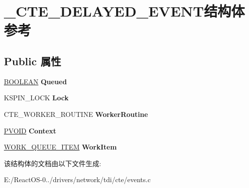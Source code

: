 \hypertarget{struct___c_t_e___d_e_l_a_y_e_d___e_v_e_n_t}{}\section{\+\_\+\+C\+T\+E\+\_\+\+D\+E\+L\+A\+Y\+E\+D\+\_\+\+E\+V\+E\+N\+T结构体 参考}
\label{struct___c_t_e___d_e_l_a_y_e_d___e_v_e_n_t}
\subsection*{Public 属性}
\begin{DoxyCompactItemize}
\item 
\mbox{\label{struct___c_t_e___d_e_l_a_y_e_d___e_v_e_n_t_a363247b4f1fa4649550b128fb5b560fe}} 
\hyperlink{_processor_bind_8h_a112e3146cb38b6ee95e64d85842e380a}{B\+O\+O\+L\+E\+AN} {\bfseries Queued}
\item 
\mbox{\label{struct___c_t_e___d_e_l_a_y_e_d___e_v_e_n_t_a48ec4bda696974fedcf2b5cd2de86de3}} 
K\+S\+P\+I\+N\+\_\+\+L\+O\+CK {\bfseries Lock}
\item 
\mbox{\label{struct___c_t_e___d_e_l_a_y_e_d___e_v_e_n_t_a595476a64a13284208a73dcaf75c83c0}} 
C\+T\+E\+\_\+\+W\+O\+R\+K\+E\+R\+\_\+\+R\+O\+U\+T\+I\+NE {\bfseries Worker\+Routine}
\item 
\mbox{\label{struct___c_t_e___d_e_l_a_y_e_d___e_v_e_n_t_a62bc9dd246ddb98b1fa1564359670332}} 
\hyperlink{interfacevoid}{P\+V\+O\+ID} {\bfseries Context}
\item 
\mbox{\label{struct___c_t_e___d_e_l_a_y_e_d___e_v_e_n_t_ab159ad1f18c0983db6d0a1db31237141}} 
\hyperlink{struct___w_o_r_k___q_u_e_u_e___i_t_e_m}{W\+O\+R\+K\+\_\+\+Q\+U\+E\+U\+E\+\_\+\+I\+T\+EM} {\bfseries Work\+Item}
\end{DoxyCompactItemize}


该结构体的文档由以下文件生成\+:\begin{DoxyCompactItemize}
\item 
E\+:/\+React\+O\+S-\/0../drivers/network/tdi/cte/events.\+c\end{DoxyCompactItemize}
